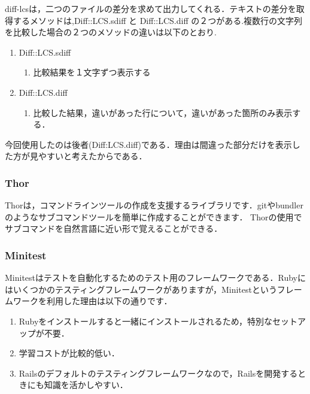 \documentclass[11pt,dvipdfmx]{jsarticle}
\providecommand{\tightlist}{%
      \setlength{\itemsep}{0pt}\setlength{\parskip}{0pt}}
\begin{document}
    diff-lcsは，二つのファイルの差分を求めて出力してくれる．テキストの差分を取得するメソッドは,Diff::LCS.sdiff
と Diff::LCS.diff
の２つがある.複数行の文字列を比較した場合の２つのメソッドの違いは以下のとおり.

\begin{enumerate}
\def\labelenumi{\arabic{enumi}.}
\tightlist
\item
  Diff::LCS.sdiff

  \begin{enumerate}
  \def\labelenumii{\arabic{enumii}.}
  \tightlist
  \item
    比較結果を１文字ずつ表示する
  \end{enumerate}
\item
  Diff::LCS.diff

  \begin{enumerate}
  \def\labelenumii{\arabic{enumii}.}
  \tightlist
  \item
    比較した結果，違いがあった行について，違いがあった箇所のみ表示する．
  \end{enumerate}
\end{enumerate}

今回使用したのは後者(Diff:LCS.diff)である．理由は間違った部分だけを表示した方が見やすいと考えたからである．

    \subsubsection{Thor}\label{thor}

    Thorは，コマンドラインツールの作成を支援するライブラリです．gitやbundlerのようなサブコマンドツールを簡単に作成することができます．
Thorの使用でサブコマンドを自然言語に近い形で覚えることができる．

    \subsubsection{Minitest}\label{minitest}

    Minitestはテストを自動化するためのテスト用のフレームワークである．Rubyにはいくつかのテスティングフレームワークがありますが，Minitestというフレームワークを利用した理由は以下の通りです．

\begin{enumerate}
\def\labelenumi{\arabic{enumi}.}
\tightlist
\item
  Rubyをインストールすると一緒にインストールされるため，特別なセットアップが不要．
\item
  学習コストが比較的低い．
\item
  Railsのデフォルトのテスティングフレームワークなので，Railsを開発するときにも知識を活かしやすい．
\end{enumerate}
\end{document}
